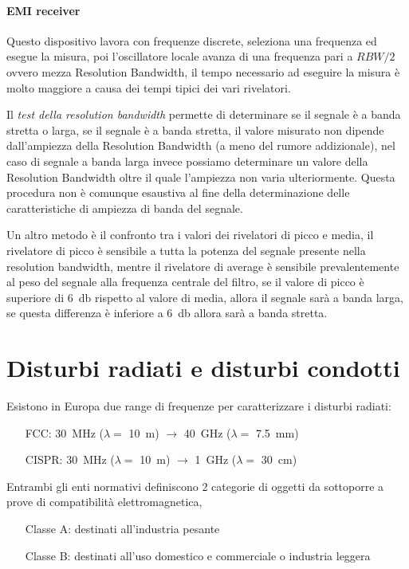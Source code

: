 
\paragraph{EMI receiver}

Questo dispositivo lavora con frequenze discrete, seleziona
una frequenza ed esegue la misura, poi l'oscillatore locale
avanza di una frequenza pari a $RBW/2$ ovvero mezza Resolution Bandwidth,
il tempo necessario ad eseguire la misura è molto maggiore a causa dei tempi
tipici dei vari rivelatori.

Il \textit{test della resolution bandwidth} permette di determinare
se il segnale è a banda stretta o larga, se il segnale è a banda stretta, il valore
misurato non dipende dall'ampiezza della Resolution Bandwidth (a meno del rumore addizionale),
nel caso di segnale a banda larga invece possiamo determinare un valore della Resolution Bandwidth oltre
il quale l'ampiezza non varia ulteriormente.
Questa procedura non è comunque esaustiva al fine della determinazione delle caratteristiche di 
ampiezza di banda del segnale.

Un altro metodo è il confronto tra i valori dei rivelatori di picco e media,
il rivelatore di picco è sensibile a tutta la potenza del segnale presente nella
resolution bandwidth, mentre il rivelatore di average è sensibile prevalentemente al peso
del segnale alla frequenza centrale del filtro, se il valore di picco è superiore di \SI{6}{\decibel}
rispetto al valore di media, allora il segnale sarà a banda larga, se questa differenza
è inferiore a \SI{6}{\decibel} allora sarà a banda stretta.

\section{Disturbi radiati e disturbi condotti}
Esistono in Europa due range di frequenze per caratterizzare i disturbi radiati:
\begin{itemize}
 \item [FCC:] \SI{30}{\mega\hertz} ($\lambda = $ \SI{10}{\meter}) $\rightarrow$ \SI{40}{\giga\hertz} ($\lambda = $ \SI{7,5}{\milli\meter})
 \item [CISPR:] \SI{30}{\mega\hertz} ($\lambda = $ \SI{10}{\meter}) $\rightarrow$ \SI{1}{\giga\hertz} ($\lambda =$ \SI{30}{\centi\meter})
\end{itemize}

Entrambi gli enti normativi definiscono 2 categorie di oggetti da sottoporre a prove di compatibilità elettromagnetica,
\begin{itemize}
 \item [Classe A:] destinati all'industria pesante
 \item [Classe B:] destinati all'uso domestico e commerciale o industria leggera
\end{itemize}


